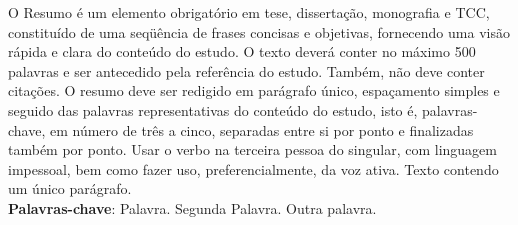 
\begin{resumo}


O Resumo é um elemento obrigatório em tese, dissertação, monografia e TCC, constituído de uma seqüência de frases concisas e objetivas, fornecendo uma visão rápida e clara do conteúdo do estudo. O texto deverá conter no máximo 500 palavras e ser antecedido
pela referência do estudo. Também, não deve conter citações. O resumo deve ser redigido em parágrafo único, espaçamento simples e seguido das palavras representativas do conteúdo do estudo, isto é, palavras-chave, em número de três a cinco, separadas entre si por ponto e finalizadas também por ponto. Usar o verbo na terceira pessoa do singular, com linguagem impessoal, bem como fazer uso, preferencialmente, da voz ativa. Texto contendo um único parágrafo.\\

\textbf{Palavras-chave}: Palavra. Segunda Palavra. Outra palavra.

\end{resumo}

%

